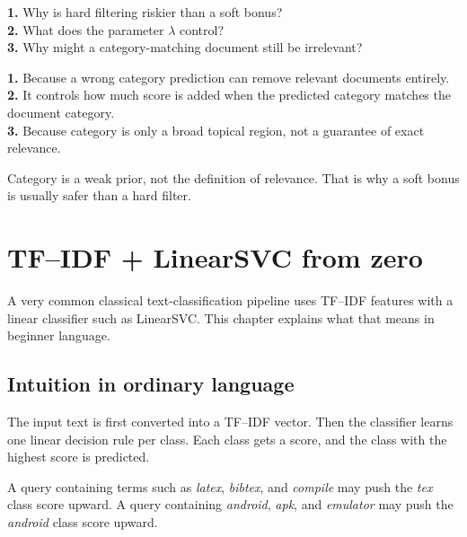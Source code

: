 \documentclass[11pt,oneside]{report}
\begin{document}
\begin{selfcheckbox}
\textbf{1.} Why is hard filtering riskier than a soft bonus?\\
\textbf{2.} What does the parameter $\lambda$ control?\\
\textbf{3.} Why might a category-matching document still be irrelevant?
\end{selfcheckbox}

\begin{answerbox}
\textbf{1.} Because a wrong category prediction can remove relevant documents entirely.\\
\textbf{2.} It controls how much score is added when the predicted category matches the document category.\\
\textbf{3.} Because category is only a broad topical region, not a guarantee of exact relevance.
\end{answerbox}

\begin{rememberbox}
Category is a weak prior, not the definition of relevance. That is why a soft bonus is usually safer than a hard filter.
\end{rememberbox}


\chapter[TF--IDF + LinearSVC]{TF--IDF + LinearSVC from zero}

\begin{purposebox}
A very common classical text-classification pipeline uses TF--IDF features with a linear classifier such as LinearSVC. This chapter explains what that means in beginner language.
\end{purposebox}

\section*{Intuition in ordinary language}
The input text is first converted into a TF--IDF vector. Then the classifier learns one linear decision rule per class. Each class gets a score, and the class with the highest score is predicted.

\begin{examplebox}
A query containing terms such as \emph{latex}, \emph{bibtex}, and \emph{compile} may push the \emph{tex} class score upward. A query containing \emph{android}, \emph{apk}, and \emph{emulator} may push the \emph{android} class score upward.
\end{examplebox}
\end{document}
